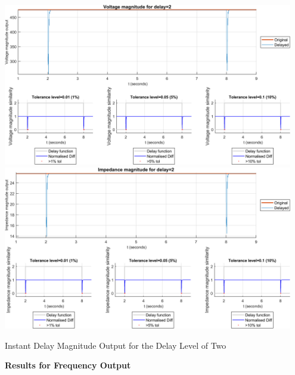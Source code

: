 \begin{floatingfigure}[p]{\textwidth}
    \includegraphics[width=0.95\textwidth]{PMUsim-figures/DelayOf_2/Instant_vMagnitude.png}    
      \includegraphics[width=0.95\textwidth]{PMUsim-figures/DelayOf_2/Instant_iMagnitude.png}
    \label{fig:PMUsim_Two_Magnitude}
    \caption{Instant Delay Magnitude Output for the Delay Level of Two}
\end{floatingfigure}

\newpage \textbf{Results for Frequency Output}

